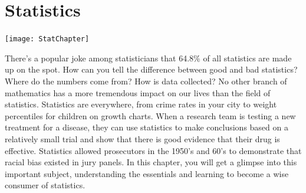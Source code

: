 \documentclass[9pt,letter,twoside,openright]{memoir}
\begin{document}

\setcounter{chapter}{2}
\setcounter{page}{85}
\chapter{Statistics}
\begin{center}\texttt{[image: StatChapter]}\end{center}

There's a popular joke among statisticians that 64.8\% of all statistics are made up on the spot. How can you tell the difference between good and bad statistics? 
Where do the numbers come from? How is data collected? No other branch of mathematics has a more tremendous impact on our lives than the field of statistics. 
Statistics are everywhere, from crime rates in your city to weight percentiles for children on growth charts. When a research team is testing a new treatment for a disease, they can use statistics to make conclusions based on a relatively small trial and show that there is good evidence that their drug is effective. Statistics allowed prosecutors in the 1950's 
and 60's to demonstrate that racial bias existed in jury panels. In this chapter, you will get a glimpse into this important subject, understanding the essentials and learning to become a wise consumer of statistics. 
\vfill
\pagebreak
\end{document}
